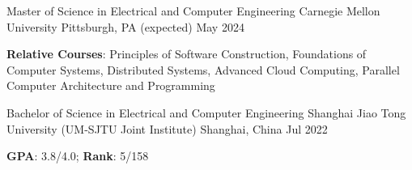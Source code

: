 

\begin{cventries}

  \cventry
    {Master of Science in Electrical and Computer Engineering} %
    {Carnegie Mellon University} %
    {Pittsburgh, PA} %
    {(expected) May 2024} %
    {
      \begin{cvitems} %
        \item {\textbf{Relative Courses}: 
          Principles of Software Construction, 
          Foundations of Computer Systems, 
          Distributed Systems, 
          Advanced Cloud Computing, 
          Parallel Computer Architecture and Programming
        }
      \end{cvitems}
    }
    
  \cventry
    {Bachelor of Science in Electrical and Computer Engineering} %
    {Shanghai Jiao Tong University (UM-SJTU Joint Institute)} %
    {Shanghai, China} %
    {Jul 2022} %
    {
      \begin{cvitems} %
        \item {\textbf{GPA}: 3.8/4.0; \textbf{Rank}: 5/158}
      \end{cvitems}
    }
\end{cventries}
